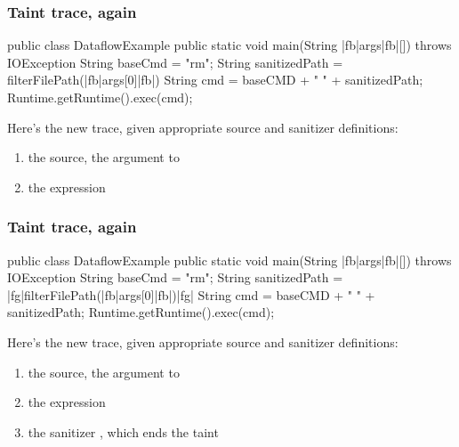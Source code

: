 \documentclass[aspectratio=169, handout]{beamer}
\begin{document}
\begin{frame}[fragile]
  \frametitle{Taint trace, again}

  \begin{minipage}[t][1.8in][t]{\textwidth}
    \begin{pythoncodeblock}[language=java]
      public class DataflowExample {
        public static void main(String |fb|args|fb|[]) throws IOException {
          String baseCmd = "rm";
          String sanitizedPath = filterFilePath(|fb|args[0]|fb|)
          String cmd = baseCMD + " " + sanitizedPath;
          Runtime.getRuntime().exec(cmd);
        }
      }
    \end{pythoncodeblock}
  \end{minipage}
  \begin{minipage}[t][1in][t]{\textwidth}
    Here's the new trace, given appropriate source and sanitizer definitions:
    \begin{enumerate}
      \item the {\color{sourceColor}source}, the  argument to 
      \item the expression 
    \end{enumerate}
  \end{minipage}
\end{frame}

\begin{frame}[fragile]
  \frametitle{Taint trace, again}

  \begin{minipage}[t][1.8in][t]{\textwidth}
    \begin{pythoncodeblock}[language=java]
      public class DataflowExample {
        public static void main(String |fb|args|fb|[]) throws IOException {
          String baseCmd = "rm";
          String sanitizedPath = |fg|filterFilePath(|fb|args[0]|fb|)|fg|
          String cmd = baseCMD + " " + sanitizedPath;
          Runtime.getRuntime().exec(cmd);
        }
      }
    \end{pythoncodeblock}
  \end{minipage}
  \begin{minipage}[t][1in][t]{\textwidth}
    Here's the new trace, given appropriate source and sanitizer definitions:
    \begin{enumerate}
      \item the {\color{sourceColor}source}, the  argument to 
      \item the expression 
      \item the sanitizer , which ends the taint
    \end{enumerate}
  \end{minipage}
\end{frame}
\end{document}
